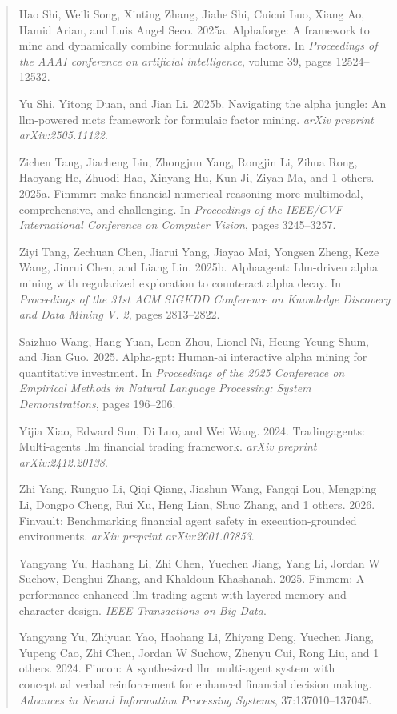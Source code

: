 \documentclass[
]{article}
\begin{document}
\begin{quote}
Hao Shi, Weili Song, Xinting Zhang, Jiahe Shi, Cuicui Luo, Xiang Ao,
Hamid Arian, and Luis Angel Seco. 2025a. Alphaforge: A framework to mine
and dynamically combine formulaic alpha factors. In \emph{Proceedings of
the AAAI conference on artificial intelligence}, volume 39, pages
12524--12532.

Yu Shi, Yitong Duan, and Jian Li. 2025b. Navigating the alpha jungle: An
llm-powered mcts framework for formulaic factor mining. \emph{arXiv
preprint arXiv:2505.11122}.

Zichen Tang, Jiacheng Liu, Zhongjun Yang, Rongjin Li, Zihua Rong,
Haoyang He, Zhuodi Hao, Xinyang Hu, Kun Ji, Ziyan Ma, and 1 others.
2025a. Finmmr: make financial numerical reasoning more multimodal,
comprehensive, and challenging. In \emph{Proceedings of the IEEE/CVF
International Conference on Computer Vision}, pages 3245--3257.

Ziyi Tang, Zechuan Chen, Jiarui Yang, Jiayao Mai, Yongsen Zheng, Keze
Wang, Jinrui Chen, and Liang Lin. 2025b. Alphaagent: Llm-driven alpha
mining with regularized exploration to counteract alpha decay. In
\emph{Proceedings of the 31st ACM SIGKDD Conference on Knowledge
Discovery and Data Mining V. 2}, pages 2813--2822.

Saizhuo Wang, Hang Yuan, Leon Zhou, Lionel Ni, Heung Yeung Shum, and
Jian Guo. 2025. Alpha-gpt: Human-ai interactive alpha mining for
quantitative investment. In \emph{Proceedings of the 2025 Conference on
Empirical Methods in Natural Language Processing: System
Demonstrations}, pages 196--206.

Yijia Xiao, Edward Sun, Di Luo, and Wei Wang. 2024. Tradingagents:
Multi-agents llm financial trading framework. \emph{arXiv preprint
arXiv:2412.20138}.

Zhi Yang, Runguo Li, Qiqi Qiang, Jiashun Wang, Fangqi Lou, Mengping Li,
Dongpo Cheng, Rui Xu, Heng Lian, Shuo Zhang, and 1 others. 2026.
Finvault: Benchmarking financial agent safety in execution-grounded
environments. \emph{arXiv preprint arXiv:2601.07853}.

Yangyang Yu, Haohang Li, Zhi Chen, Yuechen Jiang, Yang Li, Jordan W
Suchow, Denghui Zhang, and Khaldoun Khashanah. 2025. Finmem: A
performance-enhanced llm trading agent with layered memory and character
design. \emph{IEEE Transactions on Big Data}.

Yangyang Yu, Zhiyuan Yao, Haohang Li, Zhiyang Deng, Yuechen Jiang,
Yupeng Cao, Zhi Chen, Jordan W Suchow, Zhenyu Cui, Rong Liu, and 1
others. 2024. Fincon: A synthesized llm multi-agent system with
conceptual verbal reinforcement for enhanced financial decision making.
\emph{Advances in Neural Information Processing Systems},
37:137010--137045.


\end{quote}
\end{document}

